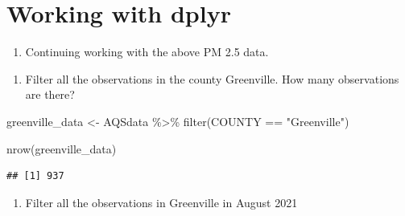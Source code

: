 \documentclass[
]{article}
\newenvironment{Shaded}{\begin{snugshade}}{\end{snugshade}}
\newcommand{\CommentTok}[1]{\textcolor[rgb]{0.56,0.35,0.01}{\textit{#1}}}
\newcommand{\DecValTok}[1]{\textcolor[rgb]{0.00,0.00,0.81}{#1}}
\newcommand{\FunctionTok}[1]{\textcolor[rgb]{0.00,0.00,0.00}{#1}}
\newcommand{\NormalTok}[1]{#1}
\newcommand{\OtherTok}[1]{\textcolor[rgb]{0.56,0.35,0.01}{#1}}
\newcommand{\SpecialCharTok}[1]{\textcolor[rgb]{0.00,0.00,0.00}{#1}}
\newcommand{\StringTok}[1]{\textcolor[rgb]{0.31,0.60,0.02}{#1}}
\providecommand{\tightlist}{%
  \setlength{\itemsep}{0pt}\setlength{\parskip}{0pt}}
\begin{document}
\hypertarget{working-with-dplyr}{%
\section{Working with dplyr}\label{working-with-dplyr}}

\begin{enumerate}
\def\labelenumi{\arabic{enumi}.}
\setcounter{enumi}{4}
\tightlist
\item
  Continuing working with the above PM 2.5 data.
\end{enumerate}

\begin{enumerate}
\def\labelenumi{\alph{enumi}.}
\tightlist
\item
  Filter all the observations in the county Greenville. How many
  observations are there?
\end{enumerate}

\begin{Shaded}
\begin{Highlighting}[]
\NormalTok{greenville\_data }\OtherTok{\textless{}{-}}\NormalTok{ AQSdata }\SpecialCharTok{\%\textgreater{}\%}
    \FunctionTok{filter}\NormalTok{(COUNTY }\SpecialCharTok{==} \StringTok{"Greenville"}\NormalTok{)}

\FunctionTok{nrow}\NormalTok{(greenville\_data)}
\end{Highlighting}
\end{Shaded}

\begin{verbatim}
## [1] 937
\end{verbatim}

\begin{enumerate}
\def\labelenumi{\alph{enumi}.}
\setcounter{enumi}{1}
\tightlist
\item
  Filter all the observations in Greenville in August 2021
\end{enumerate}

\begin{Shaded}
\end{Shaded}
\end{document}
